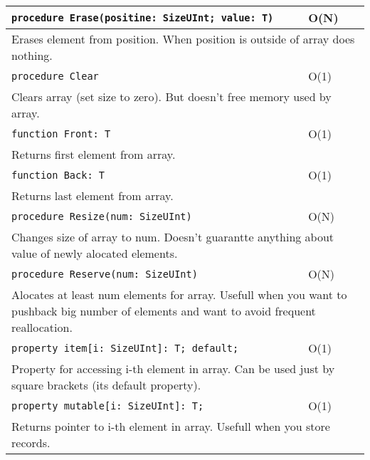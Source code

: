 \begin{longtable}{|m{10cm}|m{5cm}|}
\verb!procedure Erase(positine: SizeUInt; value: T)! & O(N) \\\hline
\multicolumn{2}{|m{15cm}|}{Erases element from position. When position is outside of array does
nothing.} \\\hline\hline

\verb!procedure Clear! & O(1) \\\hline
\multicolumn{2}{|m{15cm}|}{Clears array (set size to zero). But doesn't free memory used by array.}
\\\hline\hline

\verb!function Front: T! & O(1) \\\hline
\multicolumn{2}{|m{15cm}|}{Returns first element from array.} \\\hline\hline

\verb!function Back: T! & O(1) \\\hline
\multicolumn{2}{|m{15cm}|}{Returns last element from array.} \\\hline\hline

\verb!procedure Resize(num: SizeUInt)! & O(N) \\\hline
\multicolumn{2}{|m{15cm}|}{Changes size of array to num. Doesn't guarantte anything about value of
newly alocated elements.} \\\hline\hline

\verb!procedure Reserve(num: SizeUInt)! & O(N) \\\hline
\multicolumn{2}{|m{15cm}|}{Alocates at least num elements for array. Usefull when you want to
pushback big number of elements and want to avoid frequent reallocation.} \\\hline\hline

\verb!property item[i: SizeUInt]: T; default;! & O(1) \\\hline
\multicolumn{2}{|m{15cm}|}{Property for accessing i-th element in array. Can be used just by square
brackets (its default property).} \\\hline\hline

\verb!property mutable[i: SizeUInt]: T;! & O(1) \\\hline
\multicolumn{2}{|m{15cm}|}{Returns pointer to i-th element in array. Usefull when you store records.} \\\hline



\end{longtable}
